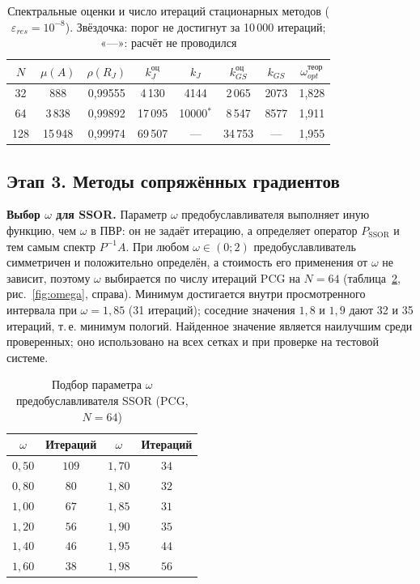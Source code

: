 \documentclass[12pt]{article}
\begin{document}
\begin{table}[H]
\centering
\caption{Спектральные оценки и число итераций стационарных методов ($\varepsilon_{res}=10^{-8}$). Звёздочка: порог не достигнут за 10\,000 итераций; «---»: расчёт не проводился}
\label{tab:spec}
\footnotesize
\begin{tabular}{|c|c|c|c|c|c|c|c|}
\hline
$N$ & $\mu(A)$ & $\rho(R_J)$ & $k_J^{\text{оц}}$ & $k_J$ & $k_{GS}^{\text{оц}}$ & $k_{GS}$ & $\omega_{opt}^{\text{теор}}$ \\
\hline
32 & 888 & 0{,}99555 & 4\,130 & 4144 & 2\,065 & 2073 & 1{,}828 \\
64 & 3\,838 & 0{,}99892 & 17\,095 & 10000$^*$ & 8\,547 & 8577 & 1{,}911 \\
128 & 15\,948 & 0{,}99974 & 69\,507 & --- & 34\,753 & --- & 1{,}955 \\
\hline
\end{tabular}
\end{table}

\subsection{Этап 3. Методы сопряжённых градиентов}

\textbf{Выбор $\omega$ для SSOR.} Параметр $\omega$ предобуславливателя выполняет иную функцию, чем $\omega$ в ПВР: он не задаёт итерацию, а определяет оператор $P_\text{SSOR}$ и тем самым спектр $P^{-1}A$. При любом $\omega\in(0;2)$ предобуславливатель симметричен и положительно определён, а стоимость его применения от $\omega$ не зависит, поэтому $\omega$ выбирается по числу итераций PCG на $N=64$ (таблица~\ref{tab:ssorscan}, рис.~\ref{fig:omega}, справа). Минимум достигается внутри просмотренного интервала при $\omega=1{,}85$ (31 итераций); соседние значения $1{,}8$ и $1{,}9$ дают 32 и 35 итераций, т.\,е. минимум пологий. Найденное значение является наилучшим среди проверенных; оно использовано на всех сетках и при проверке на тестовой системе.\par

\begin{table}[H]
\centering
\caption{Подбор параметра $\omega$ предобуславливателя SSOR (PCG, $N=64$)}
\label{tab:ssorscan}
\small
\begin{tabular}{|c|c|c|c|}
\hline
$\omega$ & Итераций & $\omega$ & Итераций \\
\hline
$0{,}50$ & $109$ & $1{,}70$ & $34$ \\
$0{,}80$ & $80$ & $1{,}80$ & $32$ \\
$1{,}00$ & $67$ & $1{,}85$ & $31$ \\
$1{,}20$ & $56$ & $1{,}90$ & $35$ \\
$1{,}40$ & $46$ & $1{,}95$ & $44$ \\
$1{,}60$ & $38$ & $1{,}98$ & $56$ \\
\hline
\end{tabular}
\end{table}
\end{document}
